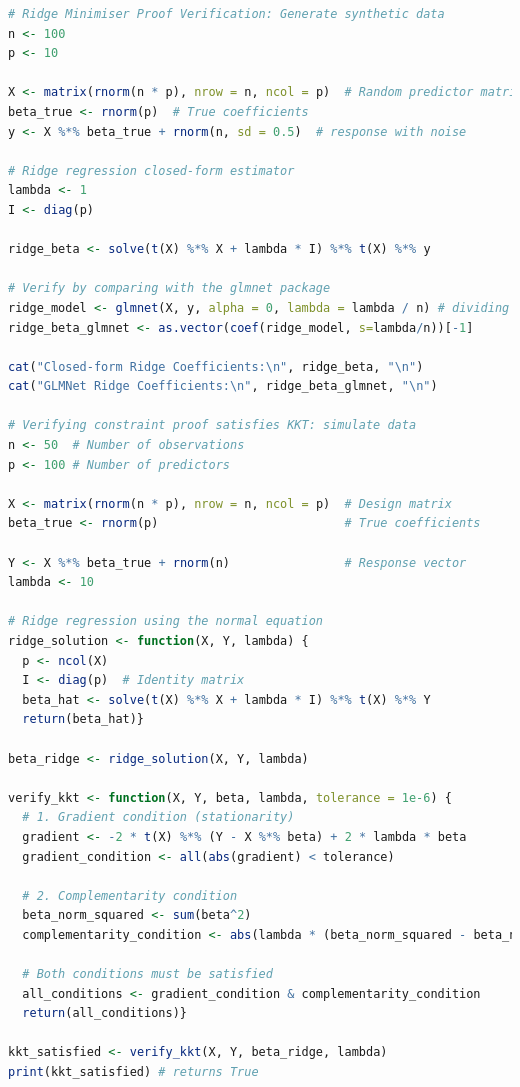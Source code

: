 \documentclass[12pt]{report} %
\begin{document}
\begin{lstlisting}[language=R, breaklines=true, basicstyle=\ttfamily\small, columns=fullflexible]
# Ridge Minimiser Proof Verification: Generate synthetic data
n <- 100  
p <- 10   

X <- matrix(rnorm(n * p), nrow = n, ncol = p)  # Random predictor matrix
beta_true <- rnorm(p)  # True coefficients
y <- X %*% beta_true + rnorm(n, sd = 0.5)  # response with noise

# Ridge regression closed-form estimator
lambda <- 1 
I <- diag(p)  

ridge_beta <- solve(t(X) %*% X + lambda * I) %*% t(X) %*% y

# Verify by comparing with the glmnet package
ridge_model <- glmnet(X, y, alpha = 0, lambda = lambda / n) # dividing by n scales lambda
ridge_beta_glmnet <- as.vector(coef(ridge_model, s=lambda/n))[-1]

cat("Closed-form Ridge Coefficients:\n", ridge_beta, "\n")
cat("GLMNet Ridge Coefficients:\n", ridge_beta_glmnet, "\n")

# Verifying constraint proof satisfies KKT: simulate data
n <- 50  # Number of observations
p <- 100 # Number of predictors

X <- matrix(rnorm(n * p), nrow = n, ncol = p)  # Design matrix
beta_true <- rnorm(p)                          # True coefficients

Y <- X %*% beta_true + rnorm(n)                # Response vector
lambda <- 10

# Ridge regression using the normal equation
ridge_solution <- function(X, Y, lambda) {
  p <- ncol(X)
  I <- diag(p)  # Identity matrix
  beta_hat <- solve(t(X) %*% X + lambda * I) %*% t(X) %*% Y
  return(beta_hat)}
  
beta_ridge <- ridge_solution(X, Y, lambda)

verify_kkt <- function(X, Y, beta, lambda, tolerance = 1e-6) {
  # 1. Gradient condition (stationarity)
  gradient <- -2 * t(X) %*% (Y - X %*% beta) + 2 * lambda * beta
  gradient_condition <- all(abs(gradient) < tolerance)
  
  # 2. Complementarity condition
  beta_norm_squared <- sum(beta^2)
  complementarity_condition <- abs(lambda * (beta_norm_squared - beta_norm_squared)) < tolerance
  
  # Both conditions must be satisfied
  all_conditions <- gradient_condition & complementarity_condition
  return(all_conditions)}

kkt_satisfied <- verify_kkt(X, Y, beta_ridge, lambda)
print(kkt_satisfied) # returns True


\end{lstlisting}
\end{document}

